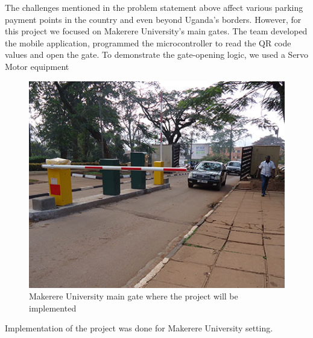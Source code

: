 The challenges mentioned in the problem statement above affect various parking payment points in the country and even beyond Uganda's borders. However, for this project we focused on Makerere University's main gates. The team developed the mobile application, programmed the microcontroller to read the QR code values and open the gate. To demonstrate the gate-opening logic, we used a Servo Motor equipment

\begin{figure}[h]
    \begin{center}
        \includegraphics[scale = 0.4]{images/gate}
        \caption{Makerere University main gate where the project will be implemented}
    \end{center}
\end{figure}
Implementation of the project was done for  Makerere University setting.


